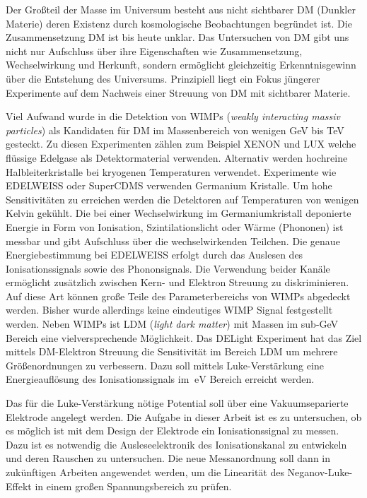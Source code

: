 Der Großteil der Masse im Universum besteht aus nicht sichtbarer DM (Dunkler Materie)
deren Existenz durch kosmologische Beobachtungen begründet ist.
Die Zusammensetzung DM ist bis heute unklar. 
Das Untersuchen von DM gibt uns nicht nur Aufschluss über ihre Eigenschaften wie Zusammensetzung, Wechselwirkung und Herkunft, sondern ermöglicht gleichzeitig Erkenntnisgewinn über die Entstehung des Universums.
Prinzipiell liegt ein Fokus jüngerer Experimente auf dem Nachweis einer Streuung von DM mit sichtbarer Materie. 

Viel Aufwand wurde in die Detektion von WIMPs (\textit{weakly interacting massiv particles}) als Kandidaten für DM im Massenbereich von wenigen GeV bis TeV gesteckt.
Zu diesen Experimenten zählen zum Beispiel XENON\cite{Aprile2017} und LUX\cite{DaSilva2017} welche flüssige Edelgase als Detektormaterial verwenden.
Alternativ werden hochreine Halbleiterkristalle bei kryogenen Temperaturen verwendet.
Experimente wie EDELWEISS\cite{EDWIII} oder SuperCDMS\cite{Agnese2018} verwenden Germanium Kristalle.
Um hohe Sensitivitäten zu erreichen werden die Detektoren auf Temperaturen von wenigen Kelvin gekühlt.
Die bei einer Wechselwirkung im Germaniumkristall deponierte Energie in Form von Ionisation, Szintilationslicht oder Wärme (Phononen) ist messbar und gibt Aufschluss über die wechselwirkenden Teilchen. 
Die genaue Energiebestimmung bei EDELWEISS erfolgt durch das Auslesen des Ionisationssignals sowie des Phononsignals.
Die Verwendung beider Kanäle ermöglicht zusätzlich zwischen Kern- und Elektron Streuung zu diskriminieren.
Auf diese Art können große Teile des Parameterbereichs von WIMPs abgedeckt werden.
Bisher wurde allerdings keine eindeutiges WIMP Signal festgestellt werden.
Neben WIMPs ist LDM (\textit{light dark matter}) mit Massen im sub-GeV Bereich eine vielversprechende Möglichkeit.
Das DELight Experiment hat das Ziel mittels DM-Elektron Streuung die Sensitivität im Bereich LDM um mehrere Größenordnungen zu verbessern.
Dazu soll mittels Luke-Verstärkung eine Energieauflösung des Ionisationssignals im $\SI{}{\electronvolt}$ Bereich erreicht werden.

Das für die Luke-Verstärkung nötige Potential soll über eine Vakuumseparierte Elektrode angelegt werden.
Die Aufgabe in dieser Arbeit ist es zu untersuchen, ob es möglich ist mit dem Design der Elektrode ein Ionisationssignal zu messen.
Dazu ist es notwendig die Ausleseelektronik des Ionisationskanal zu entwickeln und deren Rauschen zu untersuchen. 
Die neue Messanordnung soll dann in zukünftigen Arbeiten angewendet werden, um die Linearität des Neganov-Luke-Effekt in einem großen Spannungsbereich zu prüfen.
